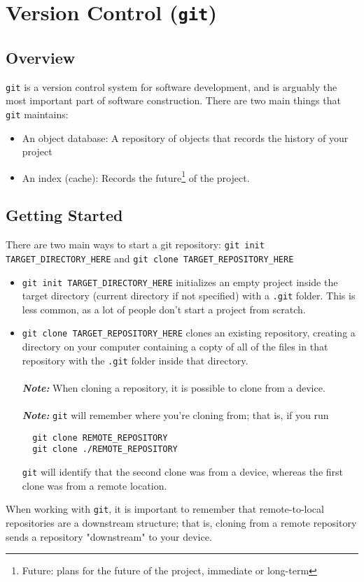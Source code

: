 \documentclass[13pt]{article}
\begin{document}
\tableofcontents
\newpage

\section{Version Control (\texttt{git})}
\subsection{Overview}
\texttt{git} is a version control system for software development, and is arguably the most important part of software construction. There are two main things that \texttt{git} maintains:
\begin{itemize}[label=,leftmargin=*]
\item An object database: A repository of objects that records the history of your project
\item An index (cache): Records the future\footnote{Future: plans for the future of the project, immediate or long-term} of the project.
\end{itemize}





\subsection{Getting Started}
There are two main ways to start a git repository: \texttt{git init TARGET\_DIRECTORY\_HERE} and \texttt{git clone TARGET\_REPOSITORY\_HERE}

\begin{itemize} [label=,leftmargin=*]
\item \texttt{git init TARGET\_DIRECTORY\_HERE} initializes an empty project inside the target directory (current directory if not specified) with a \texttt{.git} folder. This is less common, as a lot of people don't start a project from scratch.
\item \texttt{git clone TARGET\_REPOSITORY\_HERE} clones an existing repository, creating a directory on your computer containing a copty of all of the files in that repository with the \texttt{.git} folder inside that directory. \\ \\
  \textbf{\textit{Note:}} When cloning a repository, it is possible to clone from a device. \\ \\
  \textbf{\textit{Note:}} \texttt{git} will remember where you're cloning from; that is, if you run
\begin{verbatim}
  git clone REMOTE_REPOSITORY
  git clone ./REMOTE_REPOSITORY \end{verbatim}
\texttt{git} will identify that the second clone was from a device, whereas the first clone was from a remote location.
\end{itemize}
When working with \texttt{git}, it is important to remember that remote-to-local repositories are a downstream structure; that is, cloning from a remote repository sends a repository "downstream" to your device.
\end{document}
